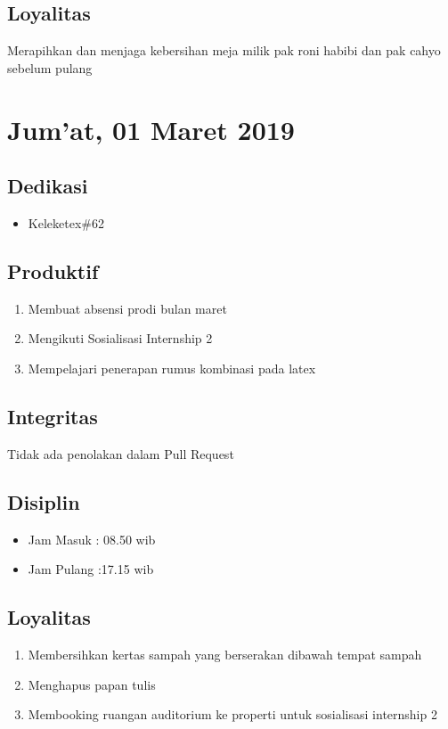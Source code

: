 \subsection{Loyalitas}
Merapihkan dan menjaga kebersihan meja milik pak roni habibi dan pak cahyo sebelum pulang

\section{Jum'at, 01 Maret 2019}
\subsection{Dedikasi}
\begin{itemize}
\item Keleketex\#62
\end{itemize}
\subsection{Produktif}
\begin{enumerate}
\item Membuat absensi prodi bulan maret
\item Mengikuti Sosialisasi Internship 2
\item Mempelajari penerapan rumus kombinasi pada latex
\end{enumerate}
\subsection{Integritas}
Tidak ada penolakan dalam Pull Request
\subsection{Disiplin}
\begin{itemize}
\item Jam Masuk : 08.50 wib
\item Jam Pulang :17.15 wib
\end{itemize}
\subsection{Loyalitas}
\begin{enumerate}
\item Membersihkan kertas sampah yang berserakan dibawah tempat sampah
\item Menghapus papan tulis
\item Membooking ruangan auditorium ke properti untuk sosialisasi internship 2 
\end{enumerate}

